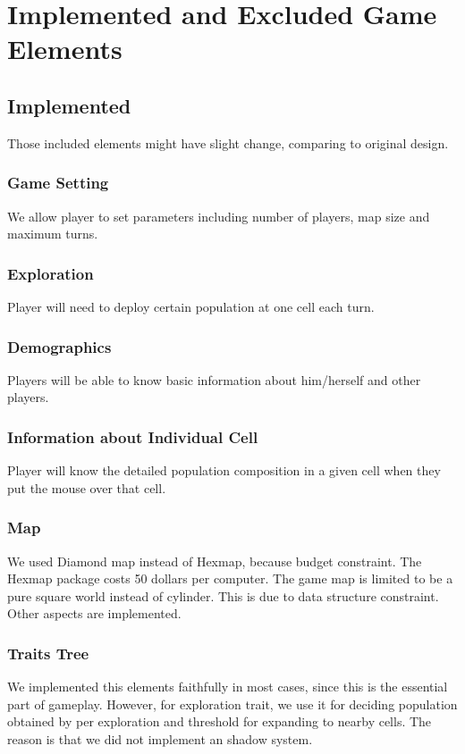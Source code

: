 \section{Implemented and Excluded Game Elements}

\subsection{Implemented}
Those included elements might have slight change, comparing to original design.
\subsubsection{Game Setting}
We allow player to set parameters including number of players, map size and maximum turns.
\subsubsection{Exploration}
Player will need to deploy certain population at one cell each turn. 
\subsubsection{Demographics}
Players will be able to know basic information about him/herself and other players.
\subsubsection{Information about Individual Cell}
Player will know the detailed population composition in a given cell when they put the mouse over that cell.

	\subsubsection{Map}
	We used Diamond map instead of Hexmap, because budget constraint. The Hexmap package costs 50 dollars per computer. The game map is limited to be a pure square world instead of cylinder. This is due to data structure constraint. Other aspects are implemented.
	\subsubsection{Traits Tree}
	We implemented this elements faithfully in most cases, since this is the essential part of gameplay. However, for exploration trait, we use it for deciding population obtained by per exploration and threshold for expanding to nearby cells. The reason is that we did not implement an shadow system.
